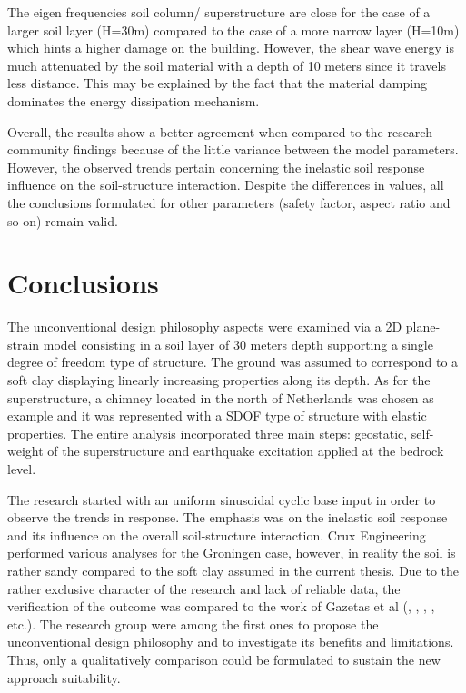 The eigen frequencies soil column/ superstructure are close for the case of a larger soil layer (H=30m) compared to the case of a more narrow layer (H=10m) which hints a higher damage on the building. However, the shear wave energy is much attenuated by the soil material with a depth of 10 meters since it travels less distance. This may be explained by the fact that the material damping dominates the energy dissipation mechanism.


Overall, the results show a better agreement when compared to the research community findings because of the little variance between the model parameters. However, the observed trends pertain concerning the inelastic soil response influence on the soil-structure interaction. Despite the differences in values, all the conclusions formulated for other parameters (safety factor, aspect ratio and so on) remain valid.

\newpage
\section{Conclusions}
The unconventional design philosophy aspects were examined via a 2D plane-strain model consisting in a soil layer of 30 meters depth supporting a single degree of freedom type of structure. The ground was assumed to correspond to a soft clay displaying linearly increasing properties along its depth. As for the superstructure, a chimney located in the north of Netherlands was chosen as example and it was represented with a SDOF type of structure with elastic properties. The entire analysis incorporated three main steps: geostatic, self-weight of the superstructure and earthquake excitation applied at the bedrock level. 

The research started with an uniform sinusoidal cyclic base input in order to observe the trends in response. The emphasis was on the inelastic soil response and its influence on the overall soil-structure interaction. Crux Engineering performed various analyses for the Groningen case, however, in reality the soil is rather sandy compared to the soft clay assumed in the current thesis. Due to the rather exclusive character of the research and lack of reliable data, the verification of the outcome was compared to the work of Gazetas et al (\cite{gazetas2004nonlinear}, \cite{anastasopoulos2010soil}, \cite{anastasopoulos2014simplified}, \cite{drosos2012soil}, etc.). The research group were among the first ones to propose the unconventional design philosophy and to investigate its benefits and limitations. Thus, only a qualitatively comparison could be formulated to sustain the new approach suitability.


